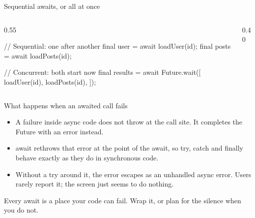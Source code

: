 \documentclass[10pt,aspectratio=169,t]{beamer}
\begin{document}
\begin{frame}[fragile,eyebrow=Async]{Sequential awaits, or all at once}
  \begin{columns}[T]
    \begin{column}{0.55\textwidth}
\begin{dart}
// Sequential: one after another
final user = await loadUser(id);
final posts = await loadPosts(id);

// Concurrent: both start now
final results = await Future.wait([
  loadUser(id),
  loadPosts(id),
]);
\end{dart}
    \end{column}
    \begin{column}{0.40\textwidth}
    \end{column}
  \end{columns}
\end{frame}

\begin{frame}[eyebrow=Async]{What happens when an awaited call fails}
  \vskip 2mm
  \begin{itemize}
    \item A failure inside async code does not throw at the call site. It completes the Future with an error instead.
    \item await rethrows that error at the point of the await, so try, catch and finally behave exactly as they do in synchronous code.
    \item Without a try around it, the error escapes as an unhandled async error. Users rarely report it; the screen just seems to do nothing.
  \end{itemize}
  \begin{takeaway}{Every await is a place your code can fail.}
    Wrap it, or plan for the silence when you do not.
  \end{takeaway}
\end{frame}
\end{document}
